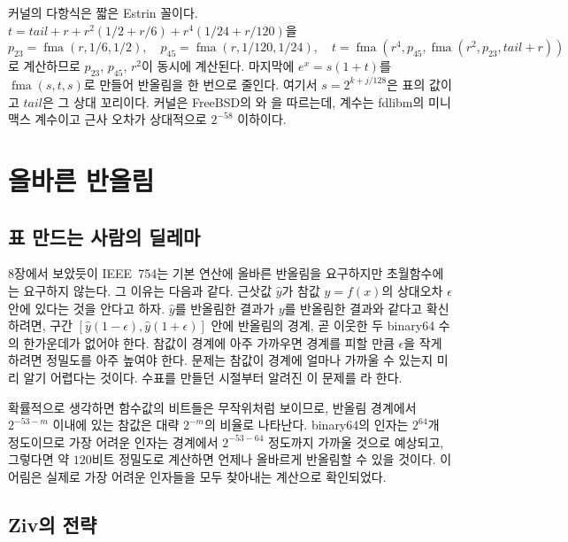 \begin{instardust}
 커널의 다항식은 짧은 Estrin 꼴이다. $t=\mathit{tail}+r+r^2(1/2+r/6)+r^4(1/24+r/120)$을
\[
p_{23}=\operatorname{fma}(r,1/6,1/2),\quad p_{45}=\operatorname{fma}(r,1/120,1/24),\quad t=\operatorname{fma}(r^4,p_{45},\operatorname{fma}(r^2,p_{23},\mathit{tail}+r))
\]
로 계산하므로 $p_{23}$, $p_{45}$, $r^2$이 동시에 계산된다. 마지막에 $e^x=s(1+t)$를 $\operatorname{fma}(s,t,s)$로 만들어 반올림을 한 번으로 줄인다. 여기서 $s=2^{k+j/128}$은 표의 값이고 $\mathit{tail}$은 그 상대 꼬리이다.  커널은 FreeBSD의 와 을 따르는데, 계수는 fdlibm의 미니맥스 계수이고 근사 오차가 상대적으로 $2^{-58}$ 이하이다.
\end{instardust}

\section{올바른 반올림}
\label{sec:correct-rounding}

\subsection{표 만드는 사람의 딜레마}

8장에서 보았듯이 IEEE~754는 기본 연산에 올바른 반올림을 요구하지만 초월함수에는 요구하지 않는다. 그 이유는 다음과 같다. 근삿값 $\hat y$가 참값 $y=f(x)$의 상대오차 $\epsilon$ 안에 있다는 것을 안다고 하자. $\hat y$를 반올림한 결과가 $y$를 반올림한 결과와 같다고 확신하려면, 구간 $[\hat y(1-\epsilon),\hat y(1+\epsilon)]$ 안에 반올림의 경계, 곧 이웃한 두 binary64 수의 한가운데가 없어야 한다. 참값이 경계에 아주 가까우면 경계를 피할 만큼 $\epsilon$을 작게 하려면 정밀도를 아주 높여야 한다. 문제는 참값이 경계에 얼마나 가까울 수 있는지 미리 알기 어렵다는 것이다. 수표를 만들던 시절부터 알려진 이 문제를 라 한다.

확률적으로 생각하면 함수값의 비트들은 무작위처럼 보이므로, 반올림 경계에서 $2^{-53-m}$ 이내에 있는 참값은 대략 $2^{-m}$의 비율로 나타난다. binary64의 인자는 $2^{64}$개 정도이므로 가장 어려운 인자는 경계에서 $2^{-53-64}$ 정도까지 가까울 것으로 예상되고, 그렇다면 약 $120$비트 정밀도로 계산하면 언제나 올바르게 반올림할 수 있을 것이다. 이 어림은 실제로 가장 어려운 인자들을 모두 찾아내는 계산으로 확인되었다\cite{lefevre1998}.

\subsection{Ziv의 전략}


